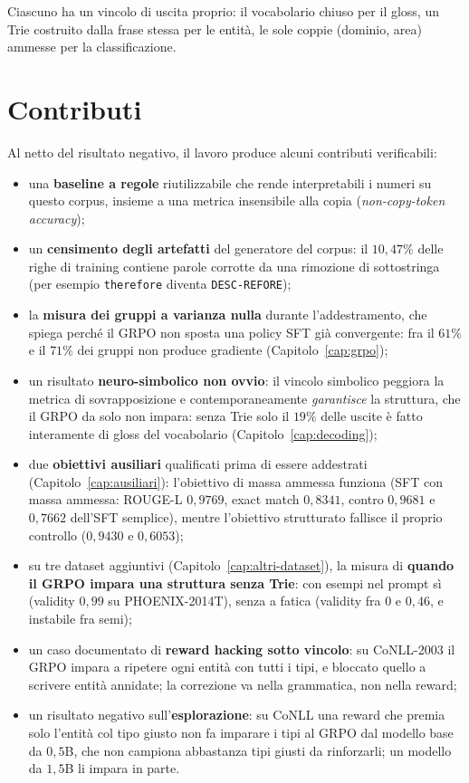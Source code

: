 Ciascuno ha un vincolo di uscita proprio: il vocabolario chiuso per il gloss,
un Trie costruito dalla frase stessa per le entità, le sole coppie (dominio,
area) ammesse per la classificazione.

\section{Contributi}

Al netto del risultato negativo, il lavoro produce alcuni contributi
verificabili:

\begin{itemize}
  \item una \textbf{baseline a regole} riutilizzabile che rende interpretabili
        i numeri su questo corpus, insieme a una metrica insensibile alla copia
        (\emph{non-copy-token accuracy});
  \item un \textbf{censimento degli artefatti} del generatore del corpus: il
        $10{,}47\%$ delle righe di training contiene parole corrotte da una
        rimozione di sottostringa (per esempio \texttt{therefore} diventa
        \texttt{DESC-REFORE});
  \item la \textbf{misura dei gruppi a varianza nulla} durante l'addestramento,
        che spiega perché il GRPO non sposta una policy SFT già convergente:
        fra il $61\%$ e il $71\%$ dei gruppi non produce gradiente
        (Capitolo~\ref{cap:grpo});
  \item un risultato \textbf{neuro-simbolico non ovvio}: il vincolo simbolico
        peggiora la metrica di sovrapposizione e contemporaneamente
        \emph{garantisce} la struttura, che il GRPO da solo non impara: senza
        Trie solo il $19\%$ delle uscite è fatto interamente di gloss del
        vocabolario (Capitolo~\ref{cap:decoding});
  \item due \textbf{obiettivi ausiliari} qualificati prima di essere
        addestrati (Capitolo~\ref{cap:ausiliari}): l'obiettivo di massa
        ammessa funziona (SFT con massa ammessa: ROUGE-L $0{,}9769$, exact match
        $0{,}8341$, contro $0{,}9681$ e $0{,}7662$ dell'SFT semplice), mentre
        l'obiettivo strutturato fallisce il proprio controllo ($0{,}9430$ e
        $0{,}6053$);
  \item su tre dataset aggiuntivi (Capitolo~\ref{cap:altri-dataset}), la
        misura di \textbf{quando il GRPO impara una struttura senza Trie}: con
        esempi nel prompt sì (validity $0{,}99$ su PHOENIX-2014T), senza
        a fatica (validity fra $0$ e $0{,}46$, e instabile fra semi);
  \item un caso documentato di \textbf{reward hacking sotto vincolo}: su
        CoNLL-2003 il GRPO impara a ripetere ogni entità con tutti i tipi, e
        bloccato quello a scrivere entità annidate; la correzione va nella
        grammatica, non nella reward;
  \item un risultato negativo sull'\textbf{esplorazione}: su CoNLL una reward
        che premia solo l'entità col tipo giusto non fa imparare i tipi al GRPO
        dal modello base da $0{,}5$B, che non campiona abbastanza tipi giusti
        da rinforzarli; un modello da $1{,}5$B li impara in parte.
\end{itemize}

